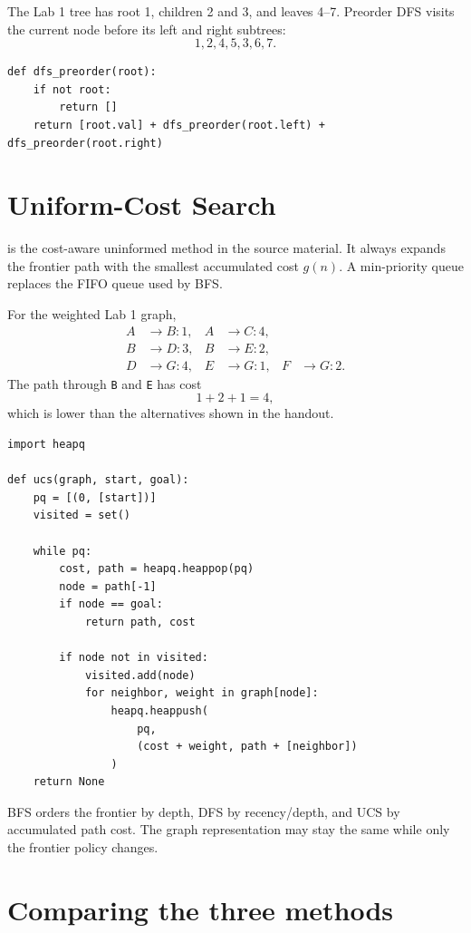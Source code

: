 The Lab 1 tree has root 1, children 2 and 3, and leaves 4--7. Preorder DFS visits the current node before its left and right subtrees:
\[
1,2,4,5,3,6,7.
\]

\begin{lstlisting}[style=mlpython]
def dfs_preorder(root):
    if not root:
        return []
    return [root.val] + dfs_preorder(root.left) + dfs_preorder(root.right)
\end{lstlisting}

\section{Uniform-Cost Search}

 is the cost-aware uninformed method in the source material. It always expands the frontier path with the smallest accumulated cost \(g(n)\). A min-priority queue replaces the FIFO queue used by BFS.

For the weighted Lab 1 graph,
\begin{align*}
A&\to B:1, & A&\to C:4,\\
B&\to D:3, & B&\to E:2,\\
D&\to G:4, & E&\to G:1, & F&\to G:2.
\end{align*}
The path through \texttt{B} and \texttt{E} has cost
\[
1+2+1=4,
\]
which is lower than the alternatives shown in the handout.

\begin{lstlisting}[style=mlpython]
import heapq

def ucs(graph, start, goal):
    pq = [(0, [start])]
    visited = set()

    while pq:
        cost, path = heapq.heappop(pq)
        node = path[-1]
        if node == goal:
            return path, cost

        if node not in visited:
            visited.add(node)
            for neighbor, weight in graph[node]:
                heapq.heappush(
                    pq,
                    (cost + weight, path + [neighbor])
                )
    return None
\end{lstlisting}

\begin{keyidea}
BFS orders the frontier by depth, DFS by recency/depth, and UCS by accumulated path cost. The graph representation may stay the same while only the frontier policy changes.
\end{keyidea}

\section{Comparing the three methods}

